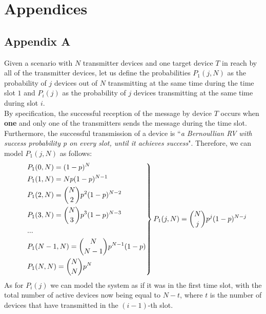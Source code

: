 %
\chapter{Appendices}
\section{Appendix A}
\label{app:a}
Given a scenario with $N$ transmitter devices and one target device $T$ in reach
by all of the transmitter devices, let us define the probabilities $P_{1}(j, N)$
as the probability of $j$ devices out of $N$ transmitting at the same time
during the time slot $1$ and $P_{i}(j)$ as the probability of $j$ devices
transmitting at the same time during slot $i$.\\
By specification, the successful reception of the message by device $T$ occurs
when \textbf{one} and only one of the transmitters sends the message during the
time slot. Furthermore, the successful transmission of a device is
``\textit{a Bernoullian RV with success probability \emph{p} on every slot, until
it achieves success}". Therefore, we can model $P_{1}(j, N)$ as follows:
\[
\begin{drcases}
    &P_{1}(0, N) = (1-p)^{N} \\
    &P_{1}(1, N) = N p(1-p)^{N-1}\\
    &P_{1}(2, N) = {N\choose2}p^{2}(1-p)^{N-2}\\
    &P_{1}(3, N) = {N\choose3}p^{3}(1-p)^{N-3}\\
    &...\\
    &P_{1}(N-1, N) = {N\choose N-1}p^{N-1}(1-p)\\
    &P_{1}(N, N) = {N\choose N}p^{N}\\
\end{drcases}
P_{1}(j, N) = {N\choose j} p^{j} (1-p)^{N-j}
\]
As for $P_{i}(j)$ we can model the system as if it was in the first time slot,
with the total number of active devices now being equal to $N - t$, where
$t$ is the number of devices that have transmitted in the $(i - 1)$-th slot.\\

\newpage
